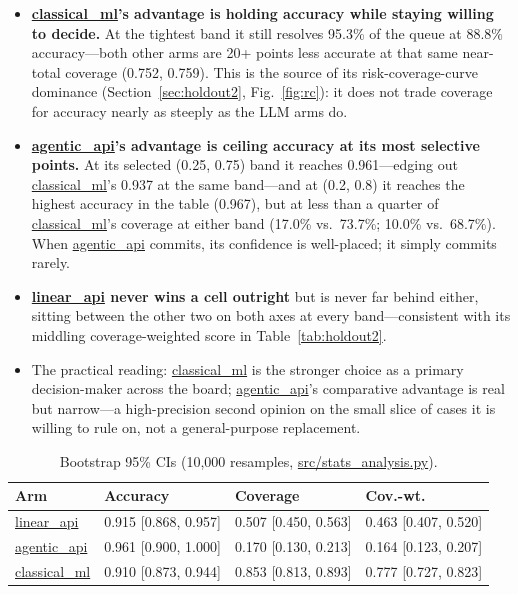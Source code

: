 \documentclass[]{ieeeaccess}
\newcommand{\code}[1]{\url{#1}}
\begin{document}
\begin{itemize}
\item \textbf{\code{classical_ml}'s advantage is holding accuracy while
  staying willing to decide.} At the tightest band it still resolves
  95.3\% of the queue at 88.8\% accuracy---both other arms are 20+
  points less accurate at that same near-total coverage (0.752, 0.759).
  This is the source of its risk-coverage-curve dominance (Section~\ref{sec:holdout2},
  Fig.~\ref{fig:rc}): it does not trade coverage for accuracy nearly as steeply as
  the LLM arms do.
\item \textbf{\code{agentic_api}'s advantage is ceiling accuracy at its
  most selective points.} At its selected (0.25, 0.75) band it reaches
  0.961---edging out \code{classical_ml}'s 0.937 at the same band---and
  at (0.2, 0.8) it reaches the highest accuracy in the table (0.967), but
  at less than a quarter of \code{classical_ml}'s coverage at either band
  (17.0\% vs.\ 73.7\%; 10.0\% vs.\ 68.7\%). When \code{agentic_api}
  commits, its confidence is well-placed; it simply commits rarely.
\item \textbf{\code{linear_api} never wins a cell outright} but is never
  far behind either, sitting between the other two on both axes at every
  band---consistent with its middling coverage-weighted score in Table~\ref{tab:holdout2}.
\item The practical reading: \code{classical_ml} is the stronger choice
  as a primary decision-maker across the board; \code{agentic_api}'s
  comparative advantage is real but narrow---a high-precision second
  opinion on the small slice of cases it is willing to rule on, not a
  general-purpose replacement.
\end{itemize}

\begin{table}[H]
\centering
\caption{Bootstrap 95\% CIs (10,000 resamples, \code{src/stats_analysis.py}).}\label{tab:boot}
\footnotesize
\begin{tabularx}{\columnwidth}{@{}lXXX@{}}
\toprule
\textbf{Arm} & \textbf{Accuracy} & \textbf{Coverage} & \textbf{Cov.-wt.} \\
\midrule
\code{linear_api} & 0.915 [0.868, 0.957] & 0.507 [0.450, 0.563] & 0.463 [0.407, 0.520] \\
\code{agentic_api} & 0.961 [0.900, 1.000] & 0.170 [0.130, 0.213] & 0.164 [0.123, 0.207] \\
\code{classical_ml} & 0.910 [0.873, 0.944] & 0.853 [0.813, 0.893] & 0.777 [0.727, 0.823] \\
\bottomrule
\end{tabularx}
\end{table}
\end{document}
